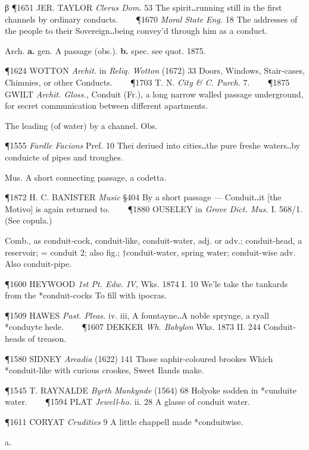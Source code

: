 \begin{description}[wide, labelwidth=!, labelindent=0pt]
\begin{myenumerate}
\noindent β \P 1651 JER. TAYLOR  \textit{Clerus Dom.} 53 The spirit‥running still in the first channels by ordinary conducts.    
\P 1670 \textit{Moral  State Eng.} 18 The addresses of the people to their Sovereign‥being convey'd through him as a conduct.

 Arch. \textbf{a.} gen. A passage (obs.). \textbf{b.} spec. see quot. 1875.

\P 1624 WOTTON \textit{Archit.} in  \textit{Reliq. Wotton} (1672) 33 Doors, Windows, Stair-cases, Chimnies, or other Conducts.    
\P 1703 T. N. \textit{City  \& C. Purch.} 7.    
\P 1875 GWILT  \textit{Archit. Gloss.}, Conduit (Fr.), a long narrow walled passage underground, for secret communication between different apartments.

 The leading (of water) by a channel. Obs.

\P 1555  \textit{Fardle Facions} Pref. 10 Thei deriued into cities‥the pure freshe waters‥by conduicte of pipes and troughes.

 Mus. A short connecting passage, a codetta.

\P 1872 H. C. BANISTER  \textit{Music} §404 By a short passage --- Conduit‥it [the Motivo] is again returned to.    
\P 1880 OUSELEY in  \textit{Grove Dict. Mus.} I. 568/1. (See copula.)

 Comb., as conduit-cock, conduit-like, conduit-water, adj. or adv.; conduit-head, a reservoir; = conduit 2; also fig.; †conduit-water, spring water; conduit-wise adv. Also conduit-pipe.

\P 1600 HEYWOOD  \textit{1st Pt. Edw. IV}, Wks. 1874 I. 10 We'le  take the tankards from the *conduit-cocks To fill with ipocras.

\P 1509 HAWES  \textit{Past. Pleas.} iv. iii, A fountayne‥A noble sprynge, a ryall *conduyte hede.    
\P 1607 DEKKER  \textit{Wh. Babylon} Wks. 1873 II. 244  Conduit-heads of treason.

\P 1580 SIDNEY  \textit{Arcadia} (1622) 141 Those saphir-coloured brookes Which *conduit-like with curious crookes, Sweet Ilands make.

\P 1545 T. RAYNALDE  \textit{Byrth Mankynde} (1564) 68 Holyoke sodden in *cunduite water.    
\P 1594 PLAT  \textit{Jewell-ho.} ii. 28 A glasse of conduit water.

\P 1611 CORYAT  \textit{Crudities} 9 A little chappell made *conduitwise.
\end{myenumerate}


 a.


\end{description}

